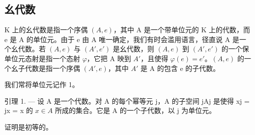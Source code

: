 \subsection{幺代数}

K 上的幺代数是指一个序偶 \((A,e)\)，其中 A 是一个带单位元的 K 上的代数，而 e 是 A 的单位元。由于 e 由 A 唯一确定，我们有时会滥用语言，径直说 A 是一个幺代数。若 \((A,e)\) 与 \((A',e')\) 是幺代数，则 \((A,e)\) 到 \((A',e')\) 的一个保单位元态射是指一个态射 \(\varphi\)，它把 A 映到 \(A'\)，且使得 \(\varphi(e)=e'\)。\((A,e)\) 的一个幺子代数是指一个序偶 \((A',e)\)，其中 \(A'\) 是 A 的包含 e 的子代数。

我们常将单位元记作 1。

引理 1. --- 设 A 是一个代数。对 A 的每个幂等元 j，A 的子空间 jAj 是使得 xj = jx = x 的 \(x \in A\) 所成的集合。它是 A 的一个子代数，以 j 为单位元。

证明是初等的。


